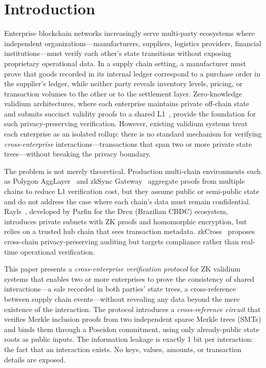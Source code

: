 
\section{Introduction}

Enterprise blockchain networks increasingly serve multi-party ecosystems where
independent organizations---manufacturers, suppliers, logistics providers,
financial institutions---must verify each other's state transitions without
exposing proprietary operational data. In a supply chain setting, a
manufacturer must prove that goods recorded in its internal ledger correspond
to a purchase order in the supplier's ledger, while neither party reveals
inventory levels, pricing, or transaction volumes to the other or to the
settlement layer. Zero-knowledge validium architectures, where each enterprise
maintains private off-chain state and submits succinct validity proofs to a
shared L1~\cite{ethereum2024validium}, provide the foundation for such
privacy-preserving verification. However, existing validium systems treat each
enterprise as an isolated rollup: there is no standard mechanism for verifying
\emph{cross-enterprise} interactions---transactions that span two or more
private state trees---without breaking the privacy boundary.

The problem is not merely theoretical. Production multi-chain environments
such as Polygon AggLayer~\cite{polygon2025agglayer} and zkSync
Gateway~\cite{zksync2025gateway} aggregate proofs from multiple chains to
reduce L1 verification cost, but they assume public or semi-public state and
do not address the case where each chain's data must remain confidential.
Rayls~\cite{rayls2025privacy}, developed by Parfin for the Drex
(Brazilian CBDC) ecosystem, introduces private subnets with ZK proofs and
homomorphic encryption, but relies on a trusted hub chain that sees
transaction metadata. zkCross~\cite{zkcross2024} proposes cross-chain
privacy-preserving auditing but targets compliance rather than real-time
operational verification.

This paper presents a \emph{cross-enterprise verification protocol} for ZK
validium systems that enables two or more enterprises to prove the consistency
of shared interactions---a sale recorded in both parties' state trees, a
cross-reference between supply chain events---without revealing any data
beyond the mere existence of the interaction. The protocol introduces a
\emph{cross-reference circuit} that verifies Merkle inclusion proofs from two
independent sparse Merkle trees (SMTs) and binds them through a Poseidon
commitment, using only already-public state roots as public inputs. The
information leakage is exactly 1 bit per interaction: the fact that an
interaction exists. No keys, values, amounts, or transaction details are
exposed.

